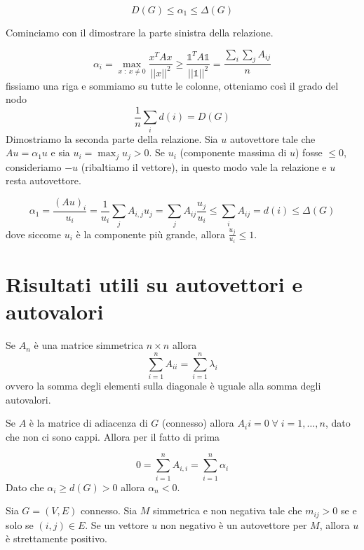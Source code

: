\documentclass[12pt]{report}
\begin{document}
$$D(G) \leq \alpha_1 \leq \Delta(G)$$
\begin{dimo}
    Cominciamo con il dimostrare la parte sinistra della relazione. 

    $$\alpha_i = \max_{x \; : \; x \neq 0} \frac{x^T A x}{||x||^2} \geq \frac{\mathds{1}^T A \mathds{1}}{||\mathds{1}||^2} = \frac{\sum_{i} \sum_j A_{ij}}{n}$$
    fissiamo una riga e sommiamo su tutte le colonne, otteniamo così il grado del nodo
    $$\frac{1}{n} \sum_i d(i) = D(G)$$
    Dimostriamo la seconda parte della relazione.
    Sia $u$ autovettore tale che $Au = \alpha_1 u$ e sia $u_i = \max_j u_j > 0$. Se $u_i$ (componente massima di $u$)  fosse $\leq 0$, consideriamo $-u$ (ribaltiamo il vettore), in questo modo vale la relazione e $u$ resta autovettore.

    $$\alpha_1 = \frac{(Au)_i}{u_i} = \frac{1}{u_i} \sum_j A_{i,j} u_j = \sum_j A_{ij} \frac{u_j}{u_i} \leq \sum_i A_{ij} = d(i) \leq \Delta(G)$$
    dove siccome $u_i$ è la componente più grande, allora $\frac{u_j}{u_i} \leq 1$.
\end{dimo}

\section{Risultati utili su autovettori e autovalori}

\begin{fatto}
    Se $A_n$ è una matrice simmetrica $n \times n$ allora 
    $$\sum_{i = 1}^n A_{ii} = \sum_{i = 1}^n \lambda_i$$
    ovvero la somma degli elementi sulla diagonale è uguale alla somma degli autovalori.
\end{fatto}

\noindent
Se $A$ è la matrice di adiacenza di $G$ (connesso) allora $A_ii = 0 \; \forall \; i = 1,\dots,n$, dato che non ci sono cappi. Allora per il fatto di prima 

$$0 = \sum_{i = 1}^n A_{i,i} = \sum_{i = 1}^n \alpha_i$$
Dato che $\alpha_i \geq d(G) > 0$ allora $\alpha_n < 0$.

\begin{lemma}
    Sia $G = (V,E)$ connesso. Sia $M$ simmetrica e non negativa tale che $m_{ij} > 0$ se e solo se $(i,j) \in E$. Se un vettore $u$ non negativo è un autovettore per $M$, allora $u$ è strettamente positivo.
\end{lemma}
\end{document}
